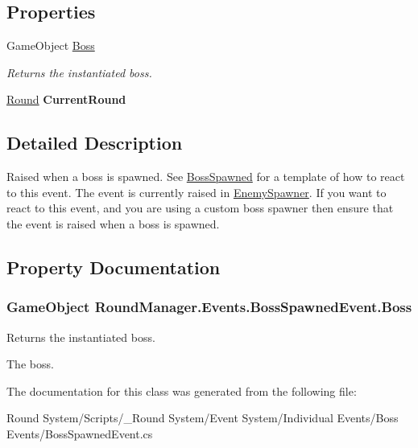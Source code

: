\subsection*{Properties}
\begin{DoxyCompactItemize}
\item 
Game\+Object \hyperlink{class_round_manager_1_1_events_1_1_boss_spawned_event_a88f4a76cb98707bc7461af40bdd46936}{Boss}
\begin{DoxyCompactList}\small\item\em Returns the instantiated boss. \end{DoxyCompactList}\item 
\hypertarget{class_round_manager_1_1_events_1_1_boss_spawned_event_a48df73916740e74e6b8ac32fb411bc3c}{}\hyperlink{class_round_manager_1_1_round}{Round} {\bfseries Current\+Round}\label{class_round_manager_1_1_events_1_1_boss_spawned_event_a48df73916740e74e6b8ac32fb411bc3c}

\end{DoxyCompactItemize}


\subsection{Detailed Description}
Raised when a boss is spawned. See \hyperlink{class_round_manager_1_1_boss_spawned}{Boss\+Spawned} for a template of how to react to this event. The event is currently raised in \hyperlink{class_round_manager_1_1_enemy_spawner}{Enemy\+Spawner}. If you want to react to this event, and you are using a custom boss spawner then ensure that the event is raised when a boss is spawned. 



\subsection{Property Documentation}
\hypertarget{class_round_manager_1_1_events_1_1_boss_spawned_event_a88f4a76cb98707bc7461af40bdd46936}{}
\subsubsection[{Boss}]{\setlength{\rightskip}{0pt plus 5cm}Game\+Object Round\+Manager.\+Events.\+Boss\+Spawned\+Event.\+Boss\hspace{0.3cm}{\ttfamily [get]}}\label{class_round_manager_1_1_events_1_1_boss_spawned_event_a88f4a76cb98707bc7461af40bdd46936}


Returns the instantiated boss. 

The boss.

The documentation for this class was generated from the following file\+:\begin{DoxyCompactItemize}
\item 
Round System/\+Scripts/\+\_\+\+Round System/\+Event System/\+Individual Events/\+Boss Events/Boss\+Spawned\+Event.\+cs\end{DoxyCompactItemize}
